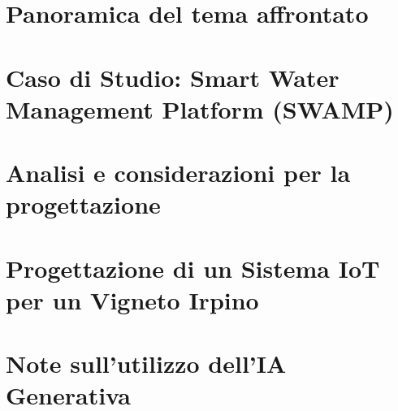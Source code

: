 \documentclass[a4paper,12pt]{report}
\begin{document}
\chapter{Panoramica del tema affrontato}


\chapter{Caso di Studio: Smart Water Management Platform (SWAMP)}


\chapter{Analisi e considerazioni per la progettazione}


\chapter{Progettazione di un Sistema IoT per un Vigneto Irpino}


\chapter*{Note sull'utilizzo dell'IA Generativa}


\printbibliography
\end{document}
